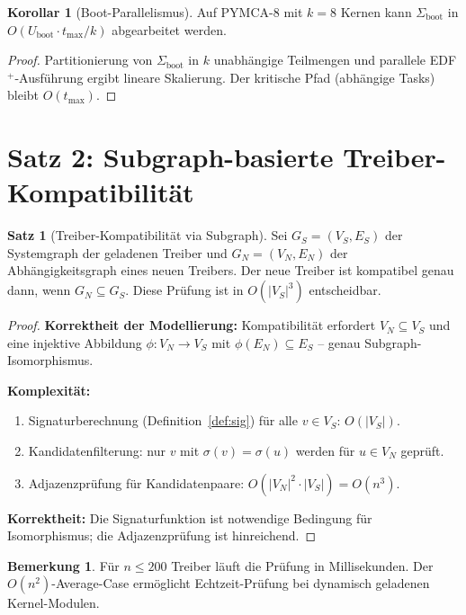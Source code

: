 ﻿\documentclass[a4paper,12pt]{scrreprt}
\theoremstyle{definition}
\newtheorem{satz}{Satz}[chapter]
\newtheorem{korollar}{Korollar}[chapter]
\newtheorem{bemerkung}{Bemerkung}[chapter]
\begin{document}
	\begin{korollar}[Boot-Parallelismus]\label{kor:boot_par}
		Auf PYMCA-8 mit $k = 8$ Kernen kann $\Sigma_{\mathrm{boot}}$ in
		$O(U_{\mathrm{boot}} \cdot t_{\max} / k)$ abgearbeitet werden.
	\end{korollar}
	
	\begin{proof}
		Partitionierung von $\Sigma_{\mathrm{boot}}$ in $k$ unabhängige
		Teilmengen und parallele EDF$^+$-Ausführung ergibt lineare Skalierung.
		Der kritische Pfad (abhängige Tasks) bleibt $O(t_{\max})$.
	\end{proof}
	
	\section{Satz 2: Subgraph-basierte Treiber-Kompatibilität}
	
	\begin{satz}[Treiber-Kompatibilität via Subgraph]\label{satz:drv_compat}
		Sei $G_S = (V_S, E_S)$ der Systemgraph der geladenen Treiber und
		$G_N = (V_N, E_N)$ der Abhängigkeitsgraph eines neuen Treibers.
		Der neue Treiber ist kompatibel genau dann, wenn $G_N \subseteq G_S$.
		Diese Prüfung ist in $O(|V_S|^3)$ entscheidbar.
	\end{satz}
	
	\begin{proof}
		\textbf{Korrektheit der Modellierung:} Kompatibilität erfordert
		$V_N \subseteq V_S$ und eine injektive Abbildung
		$\phi: V_N \to V_S$ mit $\phi(E_N) \subseteq E_S$ --
		genau Subgraph-Isomorphismus.
		
		\textbf{Komplexität:}
		\begin{enumerate}
			\item Signaturberechnung (Definition~\ref{def:sig}) für alle $v \in V_S$: $O(|V_S|)$.
			\item Kandidatenfilterung: nur $v$ mit $\sigma(v) = \sigma(u)$
			werden für $u \in V_N$ geprüft.
			\item Adjazenzprüfung für Kandidatenpaare: $O(|V_N|^2 \cdot |V_S|) = O(n^3)$.
		\end{enumerate}
		
		\textbf{Korrektheit:} Die Signaturfunktion ist notwendige Bedingung
		für Isomorphismus; die Adjazenzprüfung ist hinreichend.
	\end{proof}
	
	\begin{bemerkung}
		Für $n \leq 200$ Treiber läuft die Prüfung in Millisekunden.
		Der $O(n^2)$-Average-Case ermöglicht Echtzeit-Prüfung bei
		dynamisch geladenen Kernel-Modulen.
	\end{bemerkung}
	
\end{document}
